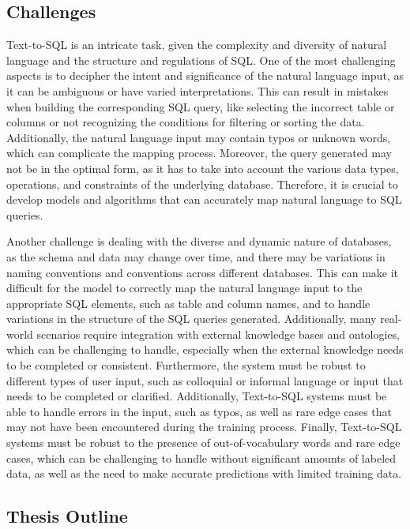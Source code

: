 \subsection{Challenges}

Text-to-SQL is an intricate task, given the complexity and diversity of natural language and the structure and regulations of SQL. One of the most challenging aspects is to decipher the intent and significance of the natural language input, as it can be ambiguous or have varied interpretations. This can result in mistakes when building the corresponding SQL query, like selecting the incorrect table or columns or not recognizing the conditions for filtering or sorting the data. Additionally, the natural language input may contain typos or unknown words, which can complicate the mapping process. Moreover, the query generated may not be in the optimal form, as it has to take into account the various data types, operations, and constraints of the underlying database. Therefore, it is crucial to develop models and algorithms that can accurately map natural language to SQL queries.

Another challenge is dealing with the diverse and dynamic nature of databases, as the schema and data may change over time, and there may be variations in naming conventions and conventions across different databases. This can make it difficult for the model to correctly map the natural language input to the appropriate SQL elements, such as table and column names, and to handle variations in the structure of the SQL queries generated. Additionally, many real-world scenarios require integration with external knowledge bases and ontologies, which can be challenging to handle, especially when the external knowledge needs to be completed or consistent. Furthermore, the system must be robust to different types of user input, such as colloquial or informal language or input that needs to be completed or clarified. Additionally, Text-to-SQL systems must be able to handle errors in the input, such as typos, as well as rare edge cases that may not have been encountered during the training process. Finally, Text-to-SQL systems must be robust to the presence of out-of-vocabulary words and rare edge cases, which can be challenging to handle without significant amounts of labeled data, as well as the need to make accurate predictions with limited training data.

\clearpage
\subsection{Thesis Outline}

